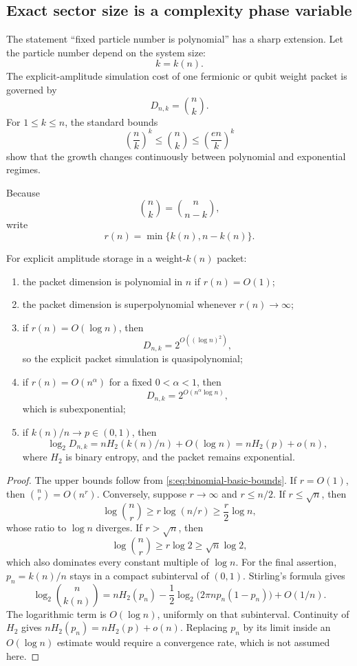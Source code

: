 \subsection{Exact sector size is a complexity phase variable}
The statement ``fixed particle number is polynomial'' has a sharp extension. Let the particle number depend on the system size:
\[
k=k(n).
\]
The explicit-amplitude simulation cost of one fermionic or qubit weight packet is governed by
\[
D_{n,k}=\binom nk.
\]
For $1\le k\le n$, the standard bounds
\begin{equation}
\left(\frac nk\right)^k
\le
\binom nk
\le
\left(\frac{en}{k}\right)^k
\label{s:eq:binomial-basic-bounds}
\end{equation}
show that the growth changes continuously between polynomial and exponential regimes.

Because
\[
\binom nk=\binom n{n-k},
\]
write
\[
r(n)=\min\{k(n),n-k(n)\}.
\]

\begin{theorem}
\label{s:thm:charge-phase-diagram}
For explicit amplitude storage in a weight-$k(n)$ packet:
\begin{enumerate}
\item the packet dimension is polynomial in $n$ if $r(n)=O(1)$;
\item the packet dimension is superpolynomial whenever $r(n)\to\infty$;
\item if $r(n)=O(\log n)$, then
\[
D_{n,k}=2^{O((\log n)^2)},
\]
so the explicit packet simulation is quasipolynomial;
\item if $r(n)=O(n^\alpha)$ for a fixed $0<\alpha<1$, then
\[
D_{n,k}=2^{O(n^\alpha\log n)},
\]
which is subexponential;
\item if $k(n)/n\to p\in(0,1)$, then
\[
\log_2 D_{n,k}
=
nH_2(k(n)/n)+O(\log n)
=
nH_2(p)+o(n),
\]
where $H_2$ is binary entropy, and the packet remains exponential.
\end{enumerate}
\end{theorem}

\begin{proof}
The upper bounds follow from \cref{s:eq:binomial-basic-bounds}. If $r=O(1)$, then $\binom nr=O(n^r)$. Conversely, suppose $r\to\infty$ and $r\le n/2$. If $r\le\sqrt n$, then
\[
\log\binom nr
\ge
r\log(n/r)
\ge
\frac r2\log n,
\]
whose ratio to $\log n$ diverges. If $r>\sqrt n$, then
\[
\log\binom nr
\ge
r\log2
\ge
\sqrt n\log2,
\]
which also dominates every constant multiple of $\log n$. For the final assertion, $p_n=k(n)/n$ stays in a compact subinterval of $(0,1)$. Stirling's formula gives
\[
\log_2\binom n{k(n)}
=nH_2(p_n)-\frac12\log_2\!\bigl(2\pi n p_n(1-p_n)\bigr)+O(1/n).
\]
The logarithmic term is $O(\log n)$, uniformly on that subinterval. Continuity of $H_2$ gives $nH_2(p_n)=nH_2(p)+o(n)$. Replacing $p_n$ by its limit inside an $O(\log n)$ estimate would require a convergence rate, which is not assumed here.
\end{proof}

